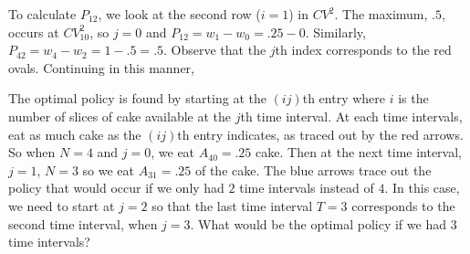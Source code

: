 \begin{center}
\end{center}

To calculate $P_{12}$, we look at the second row ($i=1$) in $CV^2$.
The maximum, $.5$, occurs at $CV_{10}^2$, so $j=0$ and $P_{12} = w_1-w_0 = .25-0$.
Similarly, $P_{42} = w_4-w_2 = 1-.5 = .5$.
Observe that the $j$th index corresponds to the red ovals.
Continuing in this manner,
\begin{center}
\end{center}

The optimal policy is found by starting at the $(ij)$th entry where $i$ is the number of slices of cake available at the $j$th time interval.
At each time intervals, eat as much cake as the $(ij)$th entry indicates, as traced out by the red arrows.
So when $N=4$ and $j=0$, we eat $A_{40}=.25$ cake.
Then at the next time interval, $j=1$, $N=3$ so we eat $A_{31}=.25$ of the cake.
The blue arrows trace out the policy that would occur if we only had $2$ time intervals instead of $4$.
In this case, we need to start at $j=2$ so that the last time interval $T=3$ corresponds to the second time interval, when $j=3$.
What would be the optimal policy if we had $3$ time intervals?



